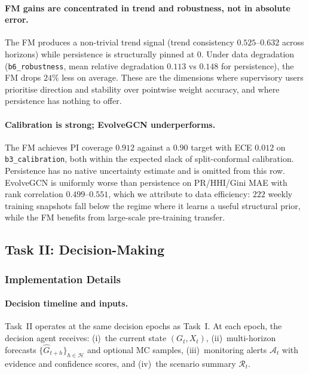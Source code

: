 \paragraph{FM gains are concentrated in trend and robustness, not in absolute error.} The FM produces a non-trivial trend signal (trend consistency $0.525$--$0.632$ across horizons) while persistence is structurally pinned at $0$. Under data degradation (\texttt{b6\_robustness}, mean relative degradation $0.113$ vs $0.148$ for persistence), the FM drops $24\%$ less on average. These are the dimensions where supervisory users prioritise direction and stability over pointwise weight accuracy, and where persistence has nothing to offer.

\paragraph{Calibration is strong; EvolveGCN underperforms.} The FM achieves PI coverage $0.912$ against a $0.90$ target with ECE $0.012$ on \texttt{b3\_calibration}, both within the expected slack of split-conformal calibration. Persistence has no native uncertainty estimate and is omitted from this row. EvolveGCN is uniformly worse than persistence on PR/HHI/Gini MAE with rank correlation $0.499$--$0.551$, which we attribute to data efficiency: $222$ weekly training snapshots fall below the regime where it learns a useful structural prior, while the FM benefits from large-scale pre-training transfer.

\subsection{Task II: Decision-Making}

\subsubsection{Implementation Details}
\label{sssec:impl_task2}

\paragraph{Decision timeline and inputs.}
Task~II operates at the same decision epochs as Task~I. At each epoch, the decision agent receives: (i)~the current state $(G_t,X_t)$, (ii)~multi-horizon forecasts $\{\widehat{G}_{t+h}\}_{h\in\mathcal{H}}$ and optional MC samples, (iii)~monitoring alerts $\mathcal{A}_t$ with evidence and confidence scores, and (iv)~the scenario summary $\mathcal{R}_t$.

